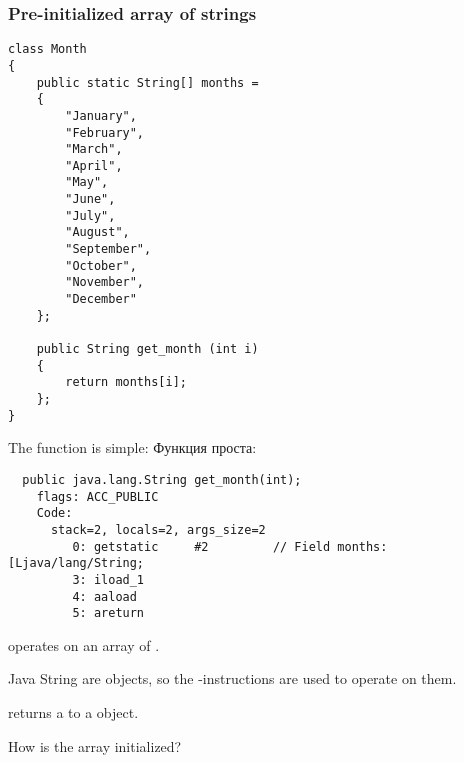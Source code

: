 \subsubsection{Pre-initialized array of strings}
\label{Java_2D_array_month}

\begin{lstlisting}[style=customjava]
class Month
{
	public static String[] months = 
	{
		"January", 
		"February", 
		"March", 
		"April",
		"May",
		"June",
		"July",
		"August",
		"September",
		"October",
		"November",
		"December"
	};

	public String get_month (int i)
	{
		return months[i];
	};
} 
\end{lstlisting}

The  function is simple:
Функция  проста:

\begin{lstlisting}
  public java.lang.String get_month(int);
    flags: ACC_PUBLIC
    Code:
      stack=2, locals=2, args_size=2
         0: getstatic     #2         // Field months:[Ljava/lang/String;
         3: iload_1       
         4: aaload        
         5: areturn       
\end{lstlisting}

 operates on an array of .

Java String are objects, so the -instructions are used to operate on them.

 returns a  to a  object.


How is the  array initialized?



